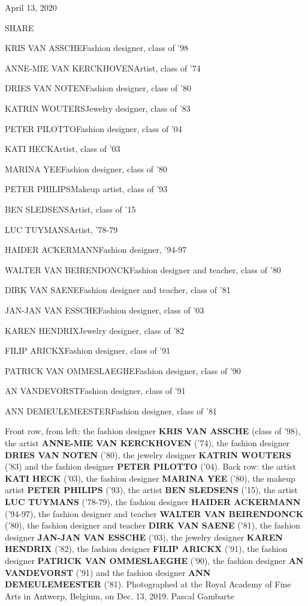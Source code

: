 April 13, 2020

SHARE

KRIS VAN ASSCHEFashion designer, class of '98

ANNE-MIE VAN KERCKHOVENArtist, class of '74

DRIES VAN NOTENFashion designer, class of '80

KATRIN WOUTERSJewelry designer, class of '83

PETER PILOTTOFashion designer, class of '04

KATI HECKArtist, class of '03

MARINA YEEFashion designer, class of '80

PETER PHILIPSMakeup artist, class of '93

BEN SLEDSENSArtist, class of '15

LUC TUYMANSArtist, '78-79

HAIDER ACKERMANNFashion designer, '94-97

WALTER VAN BEIRENDONCKFashion designer and teacher, class of '80

DIRK VAN SAENEFashion designer and teacher, class of '81

JAN-JAN VAN ESSCHEFashion designer, class of '03

KAREN HENDRIXJewelry designer, class of '82

FILIP ARICKXFashion designer, class of '91

PATRICK VAN OMMESLAEGHEFashion designer, class of '90

AN VANDEVORSTFashion designer, class of '91

ANN DEMEULEMEESTERFashion designer, class of '81

Front row, from left: the fashion designer \textbf{KRIS VAN ASSCHE}
(class of '98), the artist \textbf{ANNE-MIE VAN KERCKHOVEN} ('74), the
fashion designer \textbf{DRIES VAN NOTEN} ('80), the jewelry designer
\textbf{KATRIN WOUTERS} ('83) and the fashion designer \textbf{PETER
PILOTTO} ('04). Back row: the artist \textbf{KATI HECK} ('03), the
fashion designer \textbf{MARINA YEE} ('80), the makeup artist
\textbf{PETER PHILIPS} ('93), the artist \textbf{BEN SLEDSENS} ('15),
the artist \textbf{LUC TUYMANS} ('78-79), the fashion designer
\textbf{HAIDER ACKERMANN} ('94-97), the fashion designer and teacher
\textbf{WALTER VAN BEIRENDONCK} ('80), the fashion designer and teacher
\textbf{DIRK VAN SAENE} ('81), the fashion designer \textbf{JAN-JAN VAN
ESSCHE} ('03), the jewelry designer \textbf{KAREN HENDRIX} ('82), the
fashion designer \textbf{FILIP ARICKX} ('91), the fashion designer
\textbf{PATRICK VAN OMMESLAEGHE} ('90), the fashion designer \textbf{AN
VANDEVORST} ('91) and the fashion designer \textbf{ANN DEMEULEMEESTER}
('81). Photographed at the Royal Academy of Fine Arts in Antwerp,
Belgium, on Dec. 13, 2019. Pascal Gambarte


